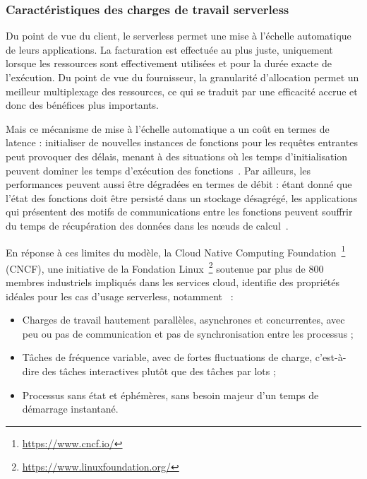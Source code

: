\subsubsection{Caractéristiques des charges de travail serverless}

Du point de vue du client, le serverless permet une mise à l'échelle automatique de leurs applications. La facturation est effectuée au plus juste, uniquement lorsque les ressources sont effectivement utilisées et pour la durée exacte de l'exécution. Du point de vue du fournisseur, la granularité d'allocation permet un meilleur multiplexage des ressources, ce qui se traduit par une efficacité accrue et donc des bénéfices plus importants.

Mais ce mécanisme de mise à l'échelle automatique a un coût en termes de latence : initialiser de nouvelles instances de fonctions pour les requêtes entrantes peut provoquer des délais, menant à des situations où les temps d'initialisation peuvent dominer les temps d'exécution des fonctions~\cite{Jiang2021TowardsDS}. Par ailleurs, les performances peuvent aussi être dégradées en termes de débit : étant donné que l'état des fonctions doit être persisté dans un stockage désagrégé, les applications qui présentent des motifs de communications entre les fonctions peuvent souffrir du temps de récupération des données dans les nœuds de calcul~\cite{mullerLambadaInteractiveData2020}.

En réponse à ces limites du modèle, la Cloud Native Computing Foundation~\footnote{\href{https://www.cncf.io/}{https://www.cncf.io/}} (\gls{CNCF}), une initiative de la Fondation Linux~\footnote{\href{https://www.linuxfoundation.org/}{https://www.linuxfoundation.org/}} soutenue par plus de 800 membres industriels impliqués dans les services cloud, identifie des propriétés idéales pour les cas d'usage serverless, notamment~\cite{cncf2018whitepaper} :

\begin{itemize}
    \item Charges de travail hautement parallèles, asynchrones et concurrentes, avec peu ou pas de communication et pas de synchronisation entre les processus ;
    \item Tâches de fréquence variable, avec de fortes fluctuations de charge, c'est-à-dire des tâches interactives plutôt que des tâches par lots ;
    \item Processus sans état et éphémères, sans besoin majeur d'un temps de démarrage instantané.
\end{itemize}

